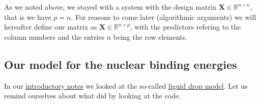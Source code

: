 \documentclass[%
oneside,                 %
final,                   %
10pt]{article}
\begin{document}
As we noted above, we stayed with a system with the design matrix 
 $\bm{X}\in {\mathbb{R}}^{n\times n}$, that is we have $p=n$. For reasons to come later (algorithmic arguments) we will hereafter define 
our matrix as $\bm{X}\in {\mathbb{R}}^{n\times p}$, with the predictors refering to the column numbers and the entries $n$ being the row elements.




\subsection*{Our model for the nuclear binding energies}

In our \href{{https://compphysics.github.io/MachineLearningMSU/doc/pub/Introduction/html/Introduction.html}}{introductory notes} we looked at the so-called \href{{https://en.wikipedia.org/wiki/Semi-empirical_mass_formula}}{liguid drop model}. Let us remind ourselves about what did by looking at the code.
\end{document}
